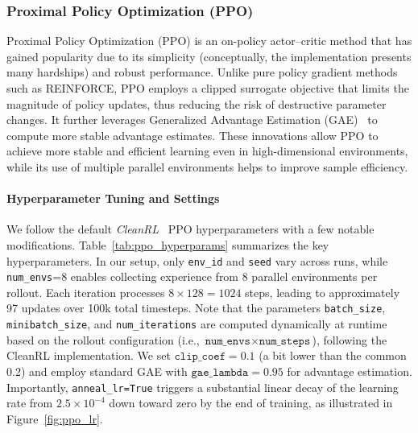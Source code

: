 \subsubsection{Proximal Policy Optimization (PPO)}
\label{subsubsec:ppo}
Proximal Policy Optimization (PPO) is an on-policy actor–critic method that has gained popularity due to its simplicity (conceptually, the implementation presents many hardships) and robust performance. Unlike pure policy gradient methods such as REINFORCE, PPO employs a clipped surrogate objective that limits the magnitude of policy updates, thus reducing the risk of destructive parameter changes. It further leverages Generalized Advantage Estimation (GAE)~\cite{schulman:gae} to compute more stable advantage estimates. These innovations allow PPO to achieve more stable and efficient learning even in high-dimensional environments, while its use of multiple parallel environments helps to improve sample efficiency.

\paragraph{Hyperparameter Tuning and Settings}
We follow the default \emph{CleanRL}~\cite{huang:cleanrl} PPO hyperparameters with a few notable modifications. Table~\ref{tab:ppo_hyperparams} summarizes the key hyperparameters. In our setup, only \texttt{env\_id} and \texttt{seed} vary across runs, while \texttt{num\_envs}=8 enables collecting experience from 8 parallel environments per rollout. Each iteration processes $8\times128=1024$ steps, leading to approximately 97 updates over 100k total timesteps.
Note that the parameters \texttt{batch\_size}, \texttt{minibatch\_size}, and \texttt{num\_iterations} are computed dynamically at runtime based on the rollout configuration (i.e., \(\texttt{num\_envs} \times \texttt{num\_steps}\)), following the CleanRL implementation.
We set \(\texttt{clip\_coef}=0.1\) (a bit lower than the common 0.2) and employ standard GAE with \(\texttt{gae\_lambda}=0.95\) for advantage estimation. Importantly, \texttt{anneal\_lr=True} triggers a substantial linear decay of the learning rate from $2.5\times10^{-4}$ down toward zero by the end of training, as illustrated in Figure~\ref{fig:ppo_lr}.


